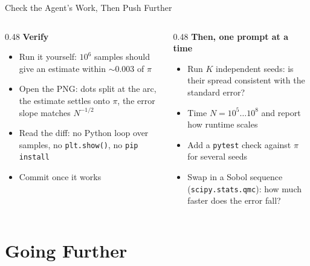 \documentclass[10pt,aspectratio=169]{beamer}
\begin{document}
\begin{frame}{Check the Agent's Work, Then Push Further}
  \begin{columns}[T]
    \begin{column}{0.48\textwidth}
      \textbf{Verify}
      \begin{itemize}\small
        \item Run it yourself: $10^6$ samples should give an estimate
          within $\sim$0.003 of $\pi$
        \item Open the PNG: dots split at the arc, the estimate settles
          onto $\pi$, the error slope matches $N^{-1/2}$
        \item Read the diff: no Python loop over samples, no
          \texttt{plt.show()}, no \texttt{pip install}
        \item Commit once it works
      \end{itemize}
    \end{column}
    \pause
    \begin{column}{0.48\textwidth}
      \textbf{Then, one prompt at a time}
      \begin{itemize}\small
        \item Run $K$ independent seeds: is their spread consistent with
          the standard error?
        \item Time $N = 10^5 \dots 10^8$ and report how runtime scales
        \item Add a \texttt{pytest} check against $\pi$ for several seeds
        \item Swap in a Sobol sequence (\texttt{scipy.stats.qmc}):
          how much faster does the error fall?
      \end{itemize}
    \end{column}
  \end{columns}
\end{frame}

\section{Going Further}
\end{document}
